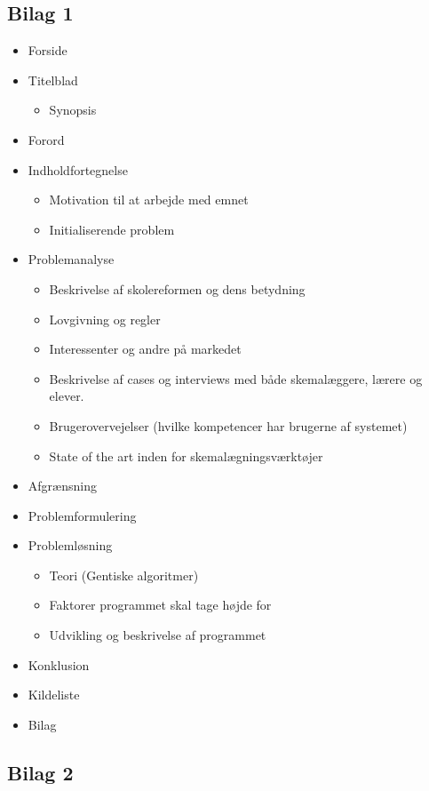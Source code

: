 \documentclass[hidelinks, 12pt]{article}
\begin{document}
	\subsection*{Bilag 1}
	\begin{itemize}
		\item Forside
		\item Titelblad
		\begin{itemize}
			\item Synopsis
		\end{itemize}
		\item Forord
		\item Indholdfortegnelse
		\begin{itemize}
			\item Motivation til at arbejde med emnet
			\item Initialiserende problem 
		\end{itemize}
		\item Problemanalyse
		\begin{itemize}
			\item Beskrivelse af skolereformen og dens betydning
			\item Lovgivning og regler
			\item Interessenter og andre på markedet
			\item Beskrivelse af cases og interviews med både skemalæggere, lærere og elever.
			\item Brugerovervejelser (hvilke kompetencer har brugerne af systemet)
			\item State of the art inden for skemalægningsværktøjer
		\end{itemize}
		\item Afgrænsning
		\item Problemformulering
		\item Problemløsning
		\begin{itemize}
			\item Teori (Gentiske algoritmer)
			\item Faktorer programmet skal tage højde for
			\item Udvikling og beskrivelse af programmet
		\end{itemize}
		\item Konklusion
		\item Kildeliste
		\item Bilag
	\end{itemize}

	\subsection*{Bilag 2}
\end{document}
